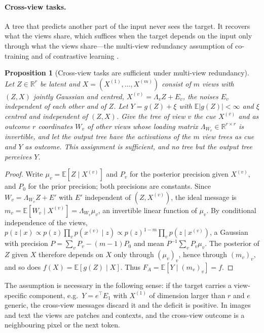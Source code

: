 \documentclass[11pt]{article}
\newtheorem{proposition}[theorem]{Proposition}
\theoremstyle{definition}
\theoremstyle{remark}
\newcommand{\R}{\mathbb{R}}
\newcommand{\E}{\mathbb{E}}
\begin{document}
\paragraph{Cross-view tasks.}
A tree that predicts another part of the input never sees the target.  It recovers what
the views share, which suffices when the target depends on the input only through what
the views share---the multi-view redundancy assumption of co-training and of
contrastive learning \citep{blum1998,tosh2021}.

\begin{proposition}[Cross-view tasks are sufficient under multi-view redundancy]\label{prop:multiview}
Let $Z\in\R^r$ be latent and $X=(X^{(1)},\dots,X^{(m)})$ consist of $m$ views with
$(Z,X)$ jointly Gaussian and centred, $X^{(v)}=\Lambda_vZ+E_v$, the noises $E_v$
independent of each other and of $Z$.  Let $Y=g(Z)+\xi$ with $\E|g(Z)|<\infty$ and $\xi$
centred and independent of $(Z,X)$.  Give the tree of view $v$ the cue $X^{(v)}$ and as
outcome $r$ coordinates $W_v$ of other views whose loading matrix $\Lambda_{W_v}\in\R^{r\times r}$
is invertible, and let the output tree have the activations of the $m$ view trees as cue
and $Y$ as outcome.  This assignment is sufficient, and no tree but the output tree
perceives $Y$.
\end{proposition}
\begin{proof}
Write $\mu_v=\E[Z\mid X^{(v)}]$ and $P_v$ for the posterior precision given $X^{(v)}$, and
$P_0$ for the prior precision; both precisions are constants.  Since $W_v=\Lambda_{W_v}Z+E'$
with $E'$ independent of $(Z,X^{(v)})$, the ideal message is
$m_v=\E[W_v\mid X^{(v)}]=\Lambda_{W_v}\mu_v$, an invertible linear function of $\mu_v$.
By conditional independence of the views,
$p(z\mid x)\propto p(z)\prod_vp(x^{(v)}\mid z)\propto p(z)^{1-m}\prod_vp(z\mid x^{(v)})$,
a Gaussian with precision $P=\sum_vP_v-(m-1)P_0$ and mean $P^{-1}\sum_vP_v\mu_v$.  The
posterior of $Z$ given $X$ therefore depends on $X$ only through $(\mu_v)_v$, hence through
$(m_v)_v$, and so does $f(X)=\E[g(Z)\mid X]$.  Thus $F_A=\E[Y\mid(m_v)_v]=f$.
\end{proof}

The assumption is necessary in the following sense: if the target carries a
view-specific component, e.g.\ $Y=e^\top E_1$ with $X^{(1)}$ of dimension larger than
$r$ and $e$ generic, the cross-view messages discard it and the deficit is positive.  In images and text the
views are patches and contexts, and the cross-view outcome is a neighbouring pixel or
the next token.
\end{document}
